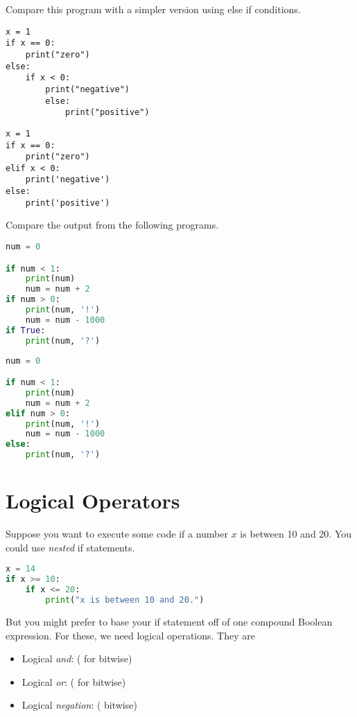 Compare this program with a simpler version using else if conditions. 
\begin{lstlisting}
x = 1
if x == 0:
    print("zero")
else:
    if x < 0:
        print("negative")
        else:
            print("positive")
\end{lstlisting}


\begin{lstlisting}
x = 1
if x == 0:
    print("zero")
elif x < 0:
    print('negative')
else:
    print('positive')
\end{lstlisting}



Compare the output from the following programs.

\begin{lstlisting}[language = Python]
num = 0

if num < 1:
    print(num)
    num = num + 2
if num > 0:
    print(num, '!')
    num = num - 1000
if True:
    print(num, '?') \end{lstlisting}


\begin{lstlisting}[language = Python]
num = 0

if num < 1:
    print(num)
    num = num + 2
elif num > 0:
    print(num, '!')
    num = num - 1000
else:
    print(num, '?') \end{lstlisting}


\section{Logical Operators}

Suppose you want to execute some code if a number $x$ is between 10 and 20. You could use \emph{nested} if statements.
\begin{lstlisting}[language = Python]
x = 14
if x >= 10:
    if x <= 20:
        print("x is between 10 and 20.") \end{lstlisting}
        

\smallskip
\noindent But you might prefer to base your if statement off of one compound Boolean expression. For these, we need logical operations. They are

\begin{itemize}

\item Logical \textit{and}:  (\code{&} for bitwise)
\item Logical \textit{or}:  (\code{|} for bitwise)
\item Logical \textit{negation}:  (\code{\~} bitwise)
\end{itemize}
\smallskip

